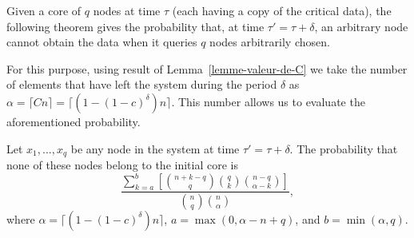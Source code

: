 \documentclass[]{llncs}
\begin{document}
Given a  core of $q$ nodes at  time $\tau$ (each having a copy of the
critical  data), 
the following theorem  gives the probability that, at time $\tau'=\tau+\delta$, an 
arbitrary node cannot obtain the data when it queries $q$ nodes arbitrarily 
chosen.  

For this purpose, using result of Lemma~\ref{lemme-valeur-de-C} we take the 
number of elements that have left the system during the period $\delta$ as 
$\alpha = \lceil Cn\rceil = \lceil(1 - (1 - c)^\delta) n\rceil$.
This number allows us to evaluate the aforementioned probability.


\begin{theorem}
	\label{theo-proba-pas-vert}
Let $x_1, ..., x_q$ be any node in the system at time $\tau'=\tau +  \delta$. The
	probability that none of these nodes belong to the initial core is
	$$\frac{\sum^{b}_{k=a}\left[\displaystyle{{n+k-q \choose q}{q \choose k}{n-q \choose \alpha-k}}\right]}{\displaystyle{n \choose q}\displaystyle{n \choose \alpha}},$$
	where $\alpha = \lceil(1 - (1 - c)^\delta) n\rceil$, 
	$a = \max(0, \alpha - n + q)$, and 
	$b = \min(\alpha, q)$.
\end{theorem}
\end{document}
